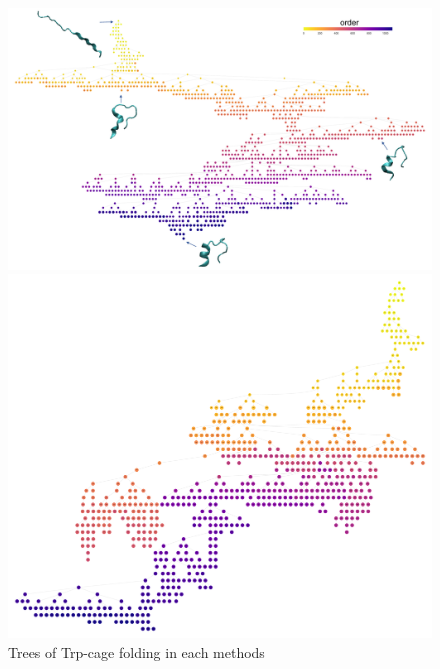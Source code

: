 \begin{figure}[t]
\begin{minipage}{1.0\hsize}
 \end{minipage}
 \begin{minipage}{1.0\hsize}
 \centering
 \includegraphics[scale=0.4]{Figures/tree_trp_pats_best.pdf}
 \end{minipage}
\begin{minipage}{1.0\hsize}
\centering
\includegraphics[scale=0.15]{Figures/tree_trp_pats_penal.pdf}
\end{minipage}
\caption{Trees of Trp-cage folding in each methods}
\label{fig:tree_trp}
\end{figure}


